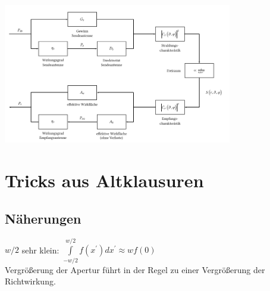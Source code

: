 \documentclass[english]{latex4ei/latex4ei_sheet}
\begin{document}
\begin{sectionbox}
	\includegraphics[width=10cm, angle=90]{./img/antennen_blockdiagram.png}
\end{sectionbox}
\section{Tricks aus Altklausuren}
\begin{sectionbox}
	\subsection{Näherungen}
	$w/2$ sehr klein: $\int\limits_{-w/2}^{w/2}f(x^{\prime}) d x^{\prime} \approx w f(0)$\\
	Vergrößerung der Apertur führt in der Regel zu einer Vergrößerung der Richtwirkung.\\
\end{sectionbox}
\end{document}
